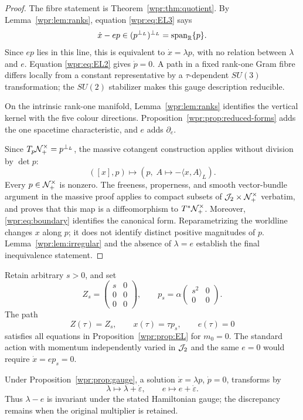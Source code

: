 \begin{proof}
The fibre statement is Theorem~\ref{wpr:thm:quotient}.  By
Lemma~\ref{wpr:lem:ranks}, equation \eqref{wpr:eq:EL3} says
\[
 \dot x-e p\in(p^{\perp_L})^{\perp_L}=\operatorname{span}_{\mathbb R}\{p\}.
\]
Since \(ep\) lies in this line, this is equivalent to
\(\dot x=\lambda p\), with no relation between \(\lambda\) and \(e\).
Equation \eqref{wpr:eq:EL2} gives \(\dot p=0\).  A path in a fixed
rank-one Gram fibre differs locally from a constant representative by
a \(\tau\)-dependent \(SU(3)\) transformation; the \(SU(2)\)
stabilizer makes this gauge description reducible.

On the intrinsic rank-one manifold,
Lemma~\ref{wpr:lem:ranks} identifies the vertical kernel with the
five colour directions.  Proposition~\ref{wpr:prop:reduced-forms}
adds the one spacetime characteristic, and \(e\) adds
\(\partial_e\).

Since \(T_p\mathcal N_+^\times=p^{\perp_L}\), the massive cotangent construction
applies without division by \(\det p\):
\[
 ([x],p)\longmapsto
 \left(p,\;A\longmapsto-\langle x,A\rangle_L\right).
\]
Every \(p\in\mathcal N_+^\times\) is nonzero.  The freeness, properness, and smooth
vector-bundle argument in the massive proof applies to compact subsets
of \(\mathcal J_2\times\mathcal N_+^\times\) verbatim, and proves that this map is a
diffeomorphism to \(T^*\mathcal N_+^\times\).  Moreover,
\eqref{wpr:eq:boundary} identifies the canonical form.  Reparametrizing
the worldline changes \(x\) along \(p\); it does not identify distinct
positive magnitudes of \(p\).  Lemma~\ref{wpr:lem:irregular} and the
absence of \(\lambda=e\) establish the final inequivalence statement.
\end{proof}

\begin{counterexample}
\label{wpr:ce:rank1}
Retain arbitrary \(s>0\), and set
\[
 Z_s=\begin{pmatrix}s&0\\0&0\\0&0\end{pmatrix},\qquad
 p_s=\alpha\begin{pmatrix}s^2&0\\0&0\end{pmatrix}.
\]
The path
\[
 Z(\tau)=Z_s,\qquad x(\tau)=\tau p_s,\qquad e(\tau)=0
\]
satisfies all equations in Proposition~\ref{wpr:prop:EL} for
\(m_0=0\).  The standard action with momentum independently varied in
\(\mathcal J_2\) and the same \(e=0\) would require \(\dot x=e p_s=0\).

Under Proposition~\ref{wpr:prop:gauge}, a solution
\(\dot x=\lambda p\), \(\dot p=0\), transforms by
\[
 \lambda\longmapsto\lambda+\dot\varepsilon,\qquad
 e\longmapsto e+\dot\varepsilon.
\]
Thus \(\lambda-e\) is invariant under the stated Hamiltonian gauge;
the discrepancy remains when the original multiplier is retained.
\end{counterexample}

